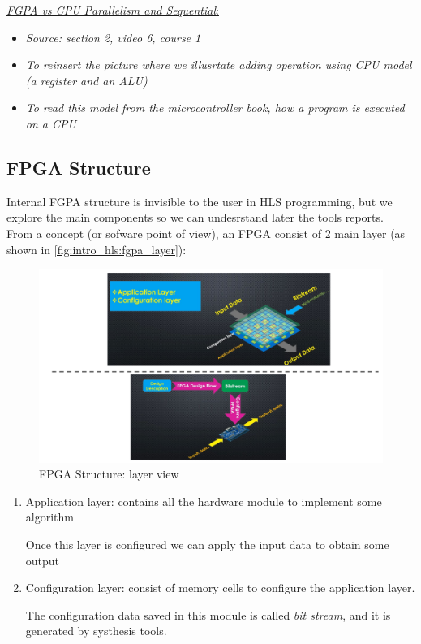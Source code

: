  \underline{\textit{FGPA vs CPU Parallelism and Sequential}:}

\begin{itemize}

\item \textit{Source: section 2, video 6, course 1}

\item \textit{To reinsert the picture where we illusrtate adding operation using CPU model (a register and an ALU)}

\item \textit{To read this model from the microcontroller book, how a program is executed on a CPU}

\end{itemize}


\newpage
\subsection{FPGA Structure}

Internal FGPA structure is invisible to the user in HLS programming, but we explore the main components so we can undesrstand later the tools reports.\\

From a concept (or sofware point of view), an FPGA consist of 2 main layer (as shown in \autoref{fig:intro_hls:fgpa_layer}):

\begin{figure}[h]
\centering
\includegraphics[scale=0.7,frame]{Figures/intro_hls/fgpa_layer}
\caption{FPGA Structure: layer view}
\label{fig:intro_hls:fgpa_layer}
\end{figure}


\begin{enumerate}

\item Application layer: contains all the hardware module to implement some algorithm

Once this layer is configured we can apply the input data to obtain some output

\item Configuration layer: consist of memory cells to configure the application layer.

The configuration data saved in this module is called \textit{bit stream}, and it is generated by systhesis tools.

\end{enumerate}

